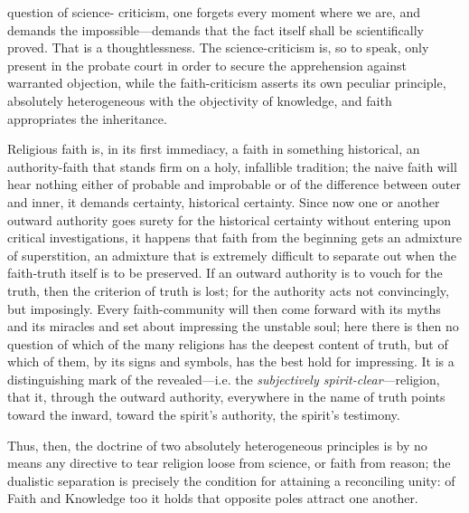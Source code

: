\documentclass[12pt]{article}
\begin{document}
question of science-
criticism, one forgets every moment where we are, and demands the
impossible—demands that the fact itself shall be scientifically proved. That
is a thoughtlessness. The science-criticism is, so to speak, only present in
the probate court in order to secure the apprehension against warranted
objection, while the faith-criticism asserts its own peculiar principle,
absolutely heterogeneous with the objectivity of knowledge, and faith
appropriates the inheritance.

Religious faith is, in its first immediacy, a faith in something historical, an
authority-faith that stands firm on a holy, infallible tradition; the naive
faith will hear nothing either of probable and improbable or of the difference
between outer and inner, it demands certainty, historical certainty. Since now
one or another outward authority goes surety for the historical certainty
without entering upon critical investigations, it happens that faith from the
beginning gets an admixture of superstition, an admixture that is extremely
difficult to separate out when the faith-truth itself is to be preserved. If an
outward authority is to vouch for the truth, then the criterion of truth is
lost; for the authority acts not convincingly, but imposingly. Every
faith-community will then come forward with its myths and its miracles and set
about impressing the unstable soul; here there is then no question of which of
the
many religions has the deepest content of truth, but of which of them, by its
signs and symbols, has the best hold for impressing. It is a distinguishing
mark of the revealed—i.e. the \emph{subjectively spirit-clear}—religion, that
it, through the outward authority, everywhere in the name of truth points
toward the inward, toward the spirit's authority, the spirit's testimony.

Thus, then, the doctrine of two absolutely heterogeneous principles is by no
means any directive to tear religion loose from science, or faith from reason;
the dualistic separation is precisely the condition for attaining a reconciling
unity: of Faith and Knowledge too it holds that opposite poles attract one
another.
\end{document}
